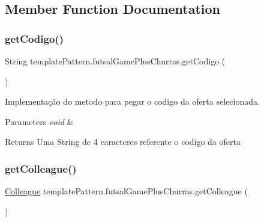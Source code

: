\subsection{Member Function Documentation}
\mbox{\label{classtemplate_pattern_1_1futsal_game_plus_churras_aa16f46158eaa353cfccc2807d6c0f29a}} 
\subsubsection{\texorpdfstring{getCodigo()}{getCodigo()}}
{\footnotesize\ttfamily String template\+Pattern.\+futsal\+Game\+Plus\+Churras.\+get\+Codigo (\begin{DoxyParamCaption}{ }\end{DoxyParamCaption})}



Implementação do metodo para pegar o codigo da oferta selecionada. 


\begin{DoxyParams}{Parameters}
{\em void} & \\
\hline
\end{DoxyParams}
\begin{DoxyReturn}{Returns}
Uma String de 4 caracteres referente o codigo da oferta 
\end{DoxyReturn}
\mbox{\label{classtemplate_pattern_1_1futsal_game_plus_churras_a2aac7732910037b89686e67952047117}} 
\subsubsection{\texorpdfstring{getColleague()}{getColleague()}}
{\footnotesize\ttfamily \mbox{\hyperlink{classmediator_pattern_1_1_colleague}{Colleague}} template\+Pattern.\+futsal\+Game\+Plus\+Churras.\+get\+Colleague (\begin{DoxyParamCaption}{ }\end{DoxyParamCaption})}



